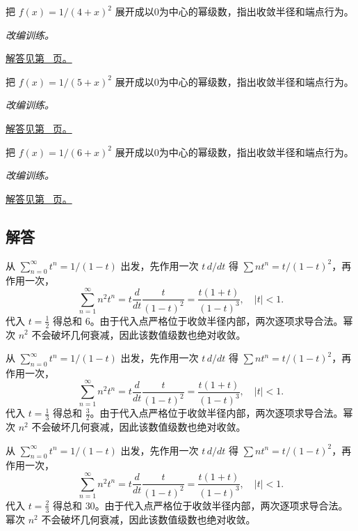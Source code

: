 \documentclass[UTF8,12pt,a4paper,fontset=fandol]{ctexart}
\begin{document}
\begin{example}[由几何展开求有理函数的级数]\label{ex:c27q22}
把 $f(x)=1/(4+x)^2$ 展开成以0为中心的幂级数，指出收敛半径和端点行为。
\par\textit{改编训练。}\par\hyperref[ans:c27q22]{解答见第~\pageref{ans:c27q22} 页。}
\end{example}
\begin{example}[由几何展开求有理函数的级数]\label{ex:c27q23}
把 $f(x)=1/(5+x)^2$ 展开成以0为中心的幂级数，指出收敛半径和端点行为。
\par\textit{改编训练。}\par\hyperref[ans:c27q23]{解答见第~\pageref{ans:c27q23} 页。}
\end{example}
\begin{example}[由几何展开求有理函数的级数]\label{ex:c27q24}
把 $f(x)=1/(6+x)^2$ 展开成以0为中心的幂级数，指出收敛半径和端点行为。
\par\textit{改编训练。}\par\hyperref[ans:c27q24]{解答见第~\pageref{ans:c27q24} 页。}
\end{example}
\subsection{解答}
\begin{solve}\label{ans:c27q1}
从 $\sum_{n=0}^\infty t^n=1/(1-t)$ 出发，先作用一次 $t\,d/dt$ 得 $\sum nt^n=t/(1-t)^2$，再作用一次，
\[
\sum_{n=1}^\infty n^2t^n=t\frac d{dt}\frac{t}{(1-t)^2}=\frac{t(1+t)}{(1-t)^3},\quad |t|<1.
\]
代入 $t=\frac{1}{2}$ 得总和 $6$。由于代入点严格位于收敛半径内部，两次逐项求导合法。幂次 $n^2$ 不会破坏几何衰减，因此该数值级数也绝对收敛。
\end{solve}

\begin{solve}\label{ans:c27q2}
从 $\sum_{n=0}^\infty t^n=1/(1-t)$ 出发，先作用一次 $t\,d/dt$ 得 $\sum nt^n=t/(1-t)^2$，再作用一次，
\[
\sum_{n=1}^\infty n^2t^n=t\frac d{dt}\frac{t}{(1-t)^2}=\frac{t(1+t)}{(1-t)^3},\quad |t|<1.
\]
代入 $t=\frac{1}{3}$ 得总和 $\frac{3}{2}$。由于代入点严格位于收敛半径内部，两次逐项求导合法。幂次 $n^2$ 不会破坏几何衰减，因此该数值级数也绝对收敛。
\end{solve}

\begin{solve}\label{ans:c27q3}
从 $\sum_{n=0}^\infty t^n=1/(1-t)$ 出发，先作用一次 $t\,d/dt$ 得 $\sum nt^n=t/(1-t)^2$，再作用一次，
\[
\sum_{n=1}^\infty n^2t^n=t\frac d{dt}\frac{t}{(1-t)^2}=\frac{t(1+t)}{(1-t)^3},\quad |t|<1.
\]
代入 $t=\frac{2}{3}$ 得总和 $30$。由于代入点严格位于收敛半径内部，两次逐项求导合法。幂次 $n^2$ 不会破坏几何衰减，因此该数值级数也绝对收敛。
\end{solve}
\end{document}
